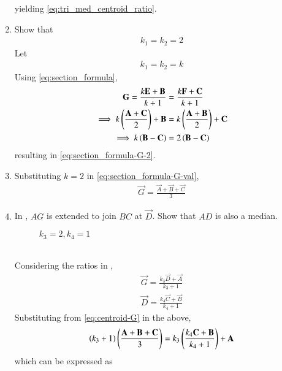 \begin{enumerate}[label=\thesection.\arabic*.,ref=\thesection.\theenumi]
yielding
\eqref{eq:tri_med_centroid_ratio}.
\item Show that
\begin{align}
	k_1 = k_2 = 2
\end{align}
\solution 
Let 
\begin{align}
	  \label{eq:section_formula-G-2}
	k_1 = k_2 = k
\end{align}
Using 
	  \eqref{eq:section_formula},
  \begin{align}
	  \label{eq:section_formula-G}
\mathbf{G} = 
	   \frac{k\mathbf{E}+ \mathbf{B}}{k+1}
	  &= \frac{k\mathbf{F}+ \mathbf{C}}{k+1}
	  \\
	  \implies 
	   k\left(\frac{\mathbf{A}+\mathbf{C}}{2}\right)+ \mathbf{B}
	  &= k\left(\frac{\mathbf{A}+\mathbf{B}}{2}\right)+ \mathbf{C}
	  \label{eq:section_formula-G-val}
	  \\
	  \implies 
	   k\left(\mathbf{B}-\mathbf{C}\right)
	  &= 
	   2\left(\mathbf{B}-\mathbf{C}\right)
  \end{align}
  resulting in 
	  \eqref{eq:section_formula-G-2}.
  \item Substituting $k = 2$ in \eqref{eq:section_formula-G-val},
\begin{align}
	\vec{G} = \frac{\vec{A}+\vec{B}+\vec{C}}{3}
	  \label{eq:centroid-G}
\end{align}
\item 
In	,	
$AG$ is extended to join $BC$ at $\vec{D}$.  Show that $AD$ is also a median.
\begin{figure}[!ht]
	\begin{center}
		\resizebox{\columnwidth}{!}{}
	\end{center}
	\caption{$k_3 = 2, k_4 =1$}
	\label{fig:tri_med_meet}	
\end{figure}
	\\
	\solution Considering the ratios in 
	,	
  \begin{align}
\vec{G} = 
	  \frac{k_3\vec{D}+\vec{A} }{k_3+1} 
	  \\
	\vec{D}  =\frac{k_4\vec{C}+\vec{B} }{k_4+1} 
  \end{align}
  Substituting from 
	  \eqref{eq:centroid-G}
	  in the above, 
  \begin{align}
	  \left(k_3+1\right)\left(\frac{\mathbf{A}+\mathbf{B} + \mathbf{C}}{3}\right)
 = 
	  {k_3\left(\frac{k_4\mathbf{C}+\mathbf{B} }{k_4+1}\right) +\mathbf{A} } 
  \end{align}
  which can be expressed as
\begin{multline}

\end{multline}
\end{enumerate}
